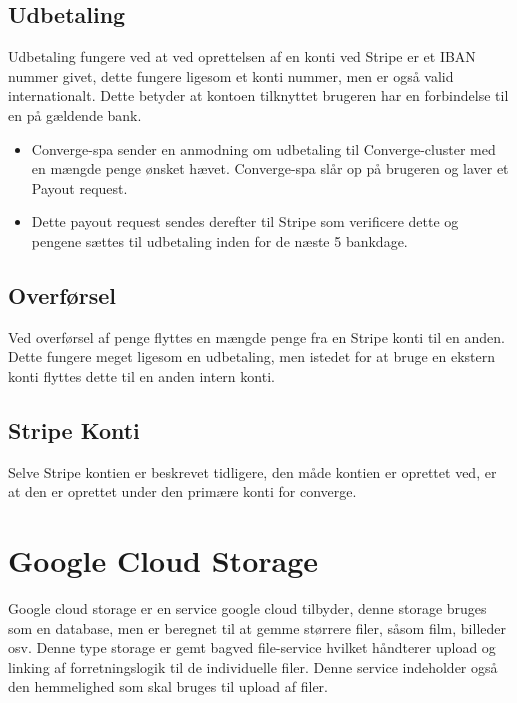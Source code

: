 \section{Udbetaling}

Udbetaling fungere ved at ved oprettelsen af en konti ved Stripe er et IBAN nummer givet, dette fungere ligesom et konti nummer, men er også valid internationalt. Dette betyder at kontoen tilknyttet brugeren har en forbindelse til en på gældende bank.

\begin{itemize}
    \item Converge-spa sender en anmodning om udbetaling til Converge-cluster med en mængde penge ønsket hævet. Converge-spa slår op på brugeren og laver et Payout request.
    \item Dette payout request sendes derefter til Stripe som verificere dette og pengene sættes til udbetaling inden for de næste 5 bankdage.
\end{itemize}

\section{Overførsel}

Ved overførsel af penge flyttes en mængde penge fra en Stripe konti til en anden. Dette fungere meget ligesom en udbetaling, men istedet for at bruge en ekstern konti flyttes dette til en anden intern konti.

\section{Stripe Konti}

Selve Stripe kontien er beskrevet tidligere, den måde kontien er oprettet ved, er at den er oprettet under den primære konti for converge.

\chapter{Google Cloud Storage}

Google cloud storage er en service google cloud tilbyder, denne storage bruges som en database, men er beregnet til at gemme størrere filer, såsom film, billeder osv. Denne type storage er gemt bagved file-service hvilket håndterer upload og linking af forretningslogik til de individuelle filer. Denne service indeholder også den hemmelighed som skal bruges til upload af filer.